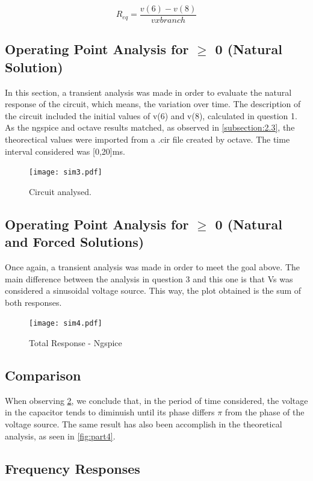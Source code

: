 \begin{equation}
R_{eq}=\frac{v(6)-v(8)}{vxbranch}
\label{eq:4}
\end{equation}


\subsection{Operating Point Analysis for $\ge$ 0 (Natural Solution)}


In this section, a transient analysis was made in order to evaluate the natural response of the circuit, which means, the variation over time. The description of the circuit included the initial values of v(6) and v(8), calculated in question 1. As the ngspice and octave results matched, as observed in \ref{subsection:2.3}, the theorectical values were imported from a .cir file created by octave.
The time interval considered was [0,20]ms.
\begin{figure}[h] \centering
\texttt{[image: sim3.pdf]}
\caption{Circuit analysed.}
\label{fig:sim3}
\end{figure}
\newpage


\subsection{Operating Point Analysis for $\ge$ 0 (Natural and Forced Solutions)}

Once again, a transient analysis was made in order to meet the goal above. The main difference between the analysis in question 3 and this one is that Vs was considered a sinusoidal voltage source. This way, the plot obtained is the sum of both responses.

\begin{figure}[h] \centering
\texttt{[image: sim4.pdf]}
\caption{Total Response - Ngspice}
\label{fig:sim4}
\end{figure}

\subsection{Comparison}
 When observing \ref{fig:sim4}, we conclude that, in the period of time considered, the voltage in the capacitor tends to diminuish until its phase differs $\pi$ from the phase of the voltage source. The same result has also been accomplish in the theoretical analysis, as seen in \ref{fig:part4}.

\newpage


\subsection{Frequency Responses}



